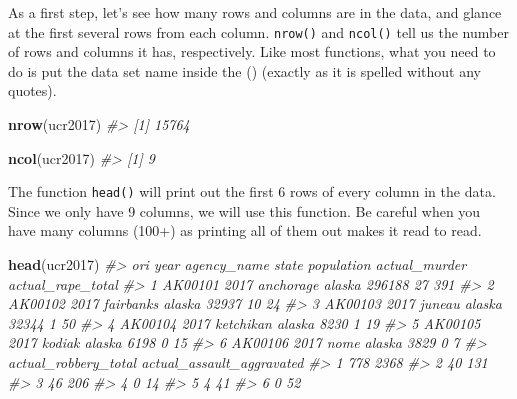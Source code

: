 \documentclass[
  12pt,
]{book}
\newenvironment{Shaded}{\begin{snugshade}}{\end{snugshade}}
\newcommand{\CommentTok}[1]{\textcolor[rgb]{0.37,0.37,0.37}{\textit{#1}}}
\newcommand{\KeywordTok}[1]{\textcolor[rgb]{0.27,0.27,0.27}{\textbf{#1}}}
\newcommand{\NormalTok}[1]{#1}
\begin{document}
As a first step, let's see how many rows and columns are in the data, and glance at the first several rows from each column. \texttt{nrow()} and \texttt{ncol()} tell us the number of rows and columns it has, respectively. Like most functions, what you need to do is put the data set name inside the () (exactly as it is spelled without any quotes).

\begin{Shaded}
\begin{Highlighting}[]
\KeywordTok{nrow}\NormalTok{(ucr2017)}
\CommentTok{\#> [1] 15764}
\end{Highlighting}
\end{Shaded}

\begin{Shaded}
\begin{Highlighting}[]
\KeywordTok{ncol}\NormalTok{(ucr2017)}
\CommentTok{\#> [1] 9}
\end{Highlighting}
\end{Shaded}

The function \texttt{head()} will print out the first 6 rows of every column in the data. Since we only have 9 columns, we will use this function. Be careful when you have many columns (100+) as printing all of them out makes it read to read.

\begin{Shaded}
\begin{Highlighting}[]
\KeywordTok{head}\NormalTok{(ucr2017)}
\CommentTok{\#>       ori year agency\_name  state population actual\_murder actual\_rape\_total}
\CommentTok{\#> 1 AK00101 2017   anchorage alaska     296188            27               391}
\CommentTok{\#> 2 AK00102 2017   fairbanks alaska      32937            10                24}
\CommentTok{\#> 3 AK00103 2017      juneau alaska      32344             1                50}
\CommentTok{\#> 4 AK00104 2017   ketchikan alaska       8230             1                19}
\CommentTok{\#> 5 AK00105 2017      kodiak alaska       6198             0                15}
\CommentTok{\#> 6 AK00106 2017        nome alaska       3829             0                 7}
\CommentTok{\#>   actual\_robbery\_total actual\_assault\_aggravated}
\CommentTok{\#> 1                  778                      2368}
\CommentTok{\#> 2                   40                       131}
\CommentTok{\#> 3                   46                       206}
\CommentTok{\#> 4                    0                        14}
\CommentTok{\#> 5                    4                        41}
\CommentTok{\#> 6                    0                        52}
\end{Highlighting}
\end{Shaded}
\end{document}
